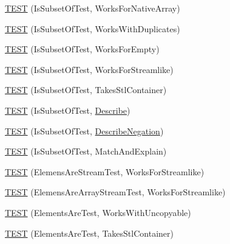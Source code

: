 \begin{DoxyCompactItemize}
\item 
\mbox{\hyperlink{namespacetesting_1_1gmock__matchers__test_ae0309b4aaaec67e3efd01102b13c17b7}{T\+E\+ST}} (Is\+Subset\+Of\+Test, Works\+For\+Native\+Array)
\item 
\mbox{\hyperlink{namespacetesting_1_1gmock__matchers__test_a6a37363fe812ad8b04db69879edf19f8}{T\+E\+ST}} (Is\+Subset\+Of\+Test, Works\+With\+Duplicates)
\item 
\mbox{\hyperlink{namespacetesting_1_1gmock__matchers__test_aa2cde172d990e3974d75ee1ccddef589}{T\+E\+ST}} (Is\+Subset\+Of\+Test, Works\+For\+Empty)
\item 
\mbox{\hyperlink{namespacetesting_1_1gmock__matchers__test_a0c74e53d448fba1689bdf80d89306670}{T\+E\+ST}} (Is\+Subset\+Of\+Test, Works\+For\+Streamlike)
\item 
\mbox{\hyperlink{namespacetesting_1_1gmock__matchers__test_aca8044618c61c7d814187623bc204a27}{T\+E\+ST}} (Is\+Subset\+Of\+Test, Takes\+Stl\+Container)
\item 
\mbox{\hyperlink{namespacetesting_1_1gmock__matchers__test_a3fb89037795dbe77c5504d76064cedaf}{T\+E\+ST}} (Is\+Subset\+Of\+Test, \mbox{\hyperlink{namespacetesting_1_1gmock__matchers__test_a738a538e1705ea49670aeb3ed25108e6}{Describe}})
\item 
\mbox{\hyperlink{namespacetesting_1_1gmock__matchers__test_a27188764d3036078c16d2efac0134e0b}{T\+E\+ST}} (Is\+Subset\+Of\+Test, \mbox{\hyperlink{namespacetesting_1_1gmock__matchers__test_a96c18b92dede79060a7303fe5d178faf}{Describe\+Negation}})
\item 
\mbox{\hyperlink{namespacetesting_1_1gmock__matchers__test_a45d11b31944031c232a0de0f47f0538a}{T\+E\+ST}} (Is\+Subset\+Of\+Test, Match\+And\+Explain)
\item 
\mbox{\hyperlink{namespacetesting_1_1gmock__matchers__test_adb0f512a2369d69f056e42e1cc5f3fc2}{T\+E\+ST}} (Elemens\+Are\+Stream\+Test, Works\+For\+Streamlike)
\item 
\mbox{\hyperlink{namespacetesting_1_1gmock__matchers__test_a5cc317a80c3501cb7f53d07043b7270c}{T\+E\+ST}} (Elemens\+Are\+Array\+Stream\+Test, Works\+For\+Streamlike)
\item 
\mbox{\hyperlink{namespacetesting_1_1gmock__matchers__test_ab403dce87c2d198a4f709d7f781d03c6}{T\+E\+ST}} (Elements\+Are\+Test, Works\+With\+Uncopyable)
\item 
\mbox{\hyperlink{namespacetesting_1_1gmock__matchers__test_a290280b9e89a57833c9fc706d153b98a}{T\+E\+ST}} (Elements\+Are\+Test, Takes\+Stl\+Container)
\item 

\end{DoxyCompactItemize}
